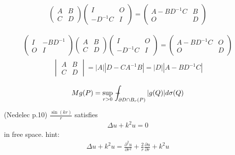 \begin{align*}
  \begin{pmatrix}
    A & B \\
    C & D
  \end{pmatrix}  
  \begin{pmatrix}
    I & O \\
    -D^{-1}C & I  
  \end{pmatrix} =  
  \begin{pmatrix}
    A-BD^{-1}C & B \\
    O & D  
  \end{pmatrix}  
\end{align*}

\begin{align*}
  \begin{pmatrix}
    I & -BD^{-1} \\
    O & I
  \end{pmatrix} 
  \begin{pmatrix}
    A & B \\
    C & D
  \end{pmatrix} 
  \begin{pmatrix}
    I & O \\
    -D^{-1}C & I  
  \end{pmatrix} =  
  \begin{pmatrix}
    A-BD^{-1}C & O \\
    O & D  
  \end{pmatrix}  
\end{align*}
\begin{align*}
  \begin{vmatrix}
    A & B \\
    C & D 
  \end{vmatrix} = |A||D-CA^{-1}B| = |D||A-BD^{-1}C|
\end{align*}

\begin{align*}
  Mg(P)=\sup_{r>0}\,\dashint_{\partial D\cap B_r(P)}|g(Q)|d\sigma(Q)
\end{align*}

(Nedelec p.10) 
$\frac{\sin(k r)}{r}$ satisfies
\begin{align*}
  \Delta u + k^2 u = 0
\end{align*}
in free space. hint:
\begin{align*}
  \Delta u + k^2 u = \frac{\partial^2 u}{\partial r^2} + \frac{2}{r}\frac{\partial u}{\partial r} + k^2 u
\end{align*}


